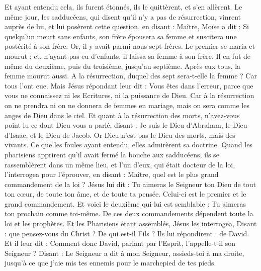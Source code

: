 \begin{multicols}{2}
Et ayant entendu cela, ils furent étonnés, ils le quittèrent, et s’en allèrent.
Le même jour, les sadducéens, qui disent qu'il n'y a pas de résurrection, vinrent auprès de lui, et lui posèrent cette question,
en disant : Maître, Moïse a dit : Si quelqu'un meurt sans enfants, son frère épousera sa femme et suscitera une postérité à son frère.
Or, il y avait parmi nous sept frères. Le premier se maria et mourut ; et, n'ayant pas eu d'enfants, il laissa sa femme à son frère.
Il en fut de même du deuxième, puis du troisième, jusqu’au septième.
Après eux tous, la femme mourut aussi.
A la résurrection, duquel des sept sera-t-elle la femme ? Car tous l'ont eue.
Mais Jésus répondant leur dit : Vous êtes dans l’erreur, parce que vous ne connaissez ni les Ecritures, ni la puissance de Dieu.
Car à la résurrection on ne prendra ni on ne donnera de femmes en mariage, mais on sera comme les anges de Dieu dans le ciel.
Et quant à la résurrection des morts, n'avez-vous point lu ce dont Dieu vous a parlé, disant :
Je suis le Dieu d'Abraham, le Dieu d'Isaac, et le Dieu de Jacob. Or Dieu n'est pas le Dieu des morts, mais des vivants.
Ce que les foules ayant entendu, elles admirèrent sa doctrine.
Quand les pharisiens apprirent qu'il avait fermé la bouche aux sadducéens, ils se rassemblèrent dans un même lieu,
et l'un d'eux, qui était docteur de la loi,  l’interrogea pour l’éprouver, en disant :
Maître, quel est le plus grand commandement de la loi ?
Jésus lui dit : Tu aimeras le Seigneur ton Dieu de tout ton cœur, de toute ton âme, et de toute ta pensée.
Celui-ci est le premier et le grand commandement.
Et voici le deuxième qui lui est semblable : Tu aimeras ton prochain comme toi-même.
De ces deux commandements dépendent toute la loi et les prophètes.
Et les Pharisiens étant assemblés, Jésus les interrogea,
Disant : que pensez-vous du Christ ? De qui est-il Fils ? Ils lui répondirent : de David.
Et il leur dit : Comment donc David, parlant par l'Esprit, l'appelle-t-il son Seigneur ? Disant :
Le Seigneur a dit à mon Seigneur, assieds-toi à ma droite, jusqu’à ce que j’aie mis tes ennemis pour le marchepied de tes pieds.

\end{multicols}
